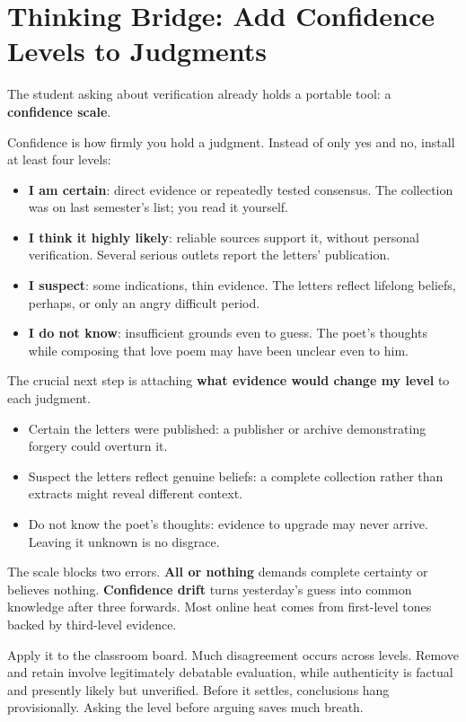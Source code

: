 \section[Add Confidence Levels to Judgments]{Thinking Bridge: Add Confidence Levels to Judgments}
The student asking about verification already holds a portable tool: a \textbf{confidence scale}.

Confidence is how firmly you hold a judgment. Instead of only yes and no, install at least four levels:

\begin{itemize}
\item \textbf{I am certain}: direct evidence or repeatedly tested consensus. The collection was on last semester's list; you read it yourself.
\item \textbf{I think it highly likely}: reliable sources support it, without personal verification. Several serious outlets report the letters' publication.
\item \textbf{I suspect}: some indications, thin evidence. The letters reflect lifelong beliefs, perhaps, or only an angry difficult period.
\item \textbf{I do not know}: insufficient grounds even to guess. The poet's thoughts while composing that love poem may have been unclear even to him.
\end{itemize}
The crucial next step is attaching \textbf{what evidence would change my level} to each judgment.

\begin{itemize}
\item Certain the letters were published: a publisher or archive demonstrating forgery could overturn it.
\item Suspect the letters reflect genuine beliefs: a complete collection rather than extracts might reveal different context.
\item Do not know the poet's thoughts: evidence to upgrade may never arrive. Leaving it unknown is no disgrace.
\end{itemize}
The scale blocks two errors. \textbf{All or nothing} demands complete certainty or believes nothing. \textbf{Confidence drift} turns yesterday's guess into common knowledge after three forwards. Most online heat comes from first-level tones backed by third-level evidence.

Apply it to the classroom board. Much disagreement occurs across levels. Remove and retain involve legitimately debatable evaluation, while authenticity is factual and presently likely but unverified. Before it settles, conclusions hang provisionally. Asking the level before arguing saves much breath.

